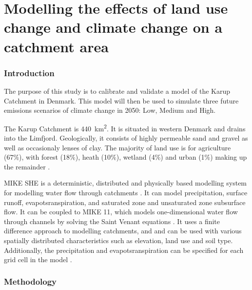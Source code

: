 \documentclass{article}
\begin{document}
\printbibliography[filter=practical1]

\newpage
\setcounter{section}{0}

\part*{Modelling the effects of land use change and climate change on a catchment area}

\section{Introduction}

The purpose of this study is to calibrate and validate a model of the Karup Catchment in Denmark. This model will then be used to simulate three future emissions scenarios of climate change in 2050: Low, Medium and High.  

The Karup Catchment is \SI{440}{km^2}. It is situated in western Denmark and drains into the Limfjord. Geologically, it consists of highly permeable sand and gravel as well as occasionaly lenses of clay. 
The majority of land use is for agriculture (67\%), with forest (18\%), heath (10\%), wetland (4\%) and urban (1\%) making up the remainder \parencite{refsgaard1997parameterisation}.


MIKE SHE is a deterministic, distributed and physically based modelling system for modelling water flow through catchments \parencite{refsgaard1995mike, refsgaard2010systeme}. It can model precipitation, surface runoff, evapotsranspiration, and saturated zone and unsaturated zone subsurface flow. It can be coupled to MIKE 11, which models one-dimensional water flow through channels by solving the Saint Venant equations \parencite{havno1995mike}.  
It uses a finite difference approach to modelling catchments, and  and can be used with various spatially distributed characteristics such as elevation, land use and soil type. Additionally, the precipitation and evapotsranspiration can be specified for each grid cell in the model \parencite{thompson2012modelling}.



\section{Methodology}
\end{document}

